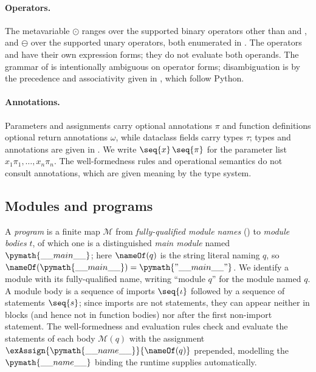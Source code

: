 

\begin{AddedBlock}

\end{AddedBlock}

\paragraph{Operators.}

The metavariable $\odot$ ranges over the supported binary operators other than  and
, and $\ominus$ over the supported unary
operators, both enumerated in . The operators  and  have their own
expression forms; they do not evaluate both operands. The grammar of  is intentionally ambiguous
on operator forms; disambiguation is by the precedence and associativity given in ,
which follow Python.



\begin{AddedBlock}
\paragraph{Annotations.}

Parameters and assignments carry optional annotations $\pi$ and function definitions optional return
annotations $\omega$, while dataclass fields carry types $\tau$; types and annotations are given in
. We write $\seq{x}\,\seq{\pi}$ for the parameter list $x_1\pi_1, \ldots,
x_n\pi_n$. The well-formedness rules and operational semantics do not consult annotations, which are given
meaning by the type system.
\end{AddedBlock}

\subsection{Modules and programs}
\label{sec:modules-programs}

A \PurePy \emph{program} is a finite map $\mathcal{M}$ from \emph{fully-qualified module names}
() to \emph{module bodies} $t$, of which one is a distinguished \emph{main module} named
$\pymath{\_\_main\_\_}$; here $\nameOf(q)$ is the string literal naming $q$, so
$\nameOf(\pymath{\_\_main\_\_}) = \pymath{"\_\_main\_\_"}$. We identify a module with its fully-qualified name, writing ``module $q$'' for the module named $q$. A module body is a sequence of imports
$\seq{\iota}$ followed by a sequence of statements $\seq{s}$; since imports are not statements, they can
appear neither in blocks (and hence not in function bodies) nor after the first non-import statement. The
well-formedness and evaluation rules check and evaluate the statements of each body $\mathcal{M}(q)$ with the
assignment $\exAssign{\pymath{\_\_name\_\_}}{\nameOf(q)}$ prepended, modelling the
$\pymath{\_\_name\_\_}$ binding the runtime supplies automatically.

